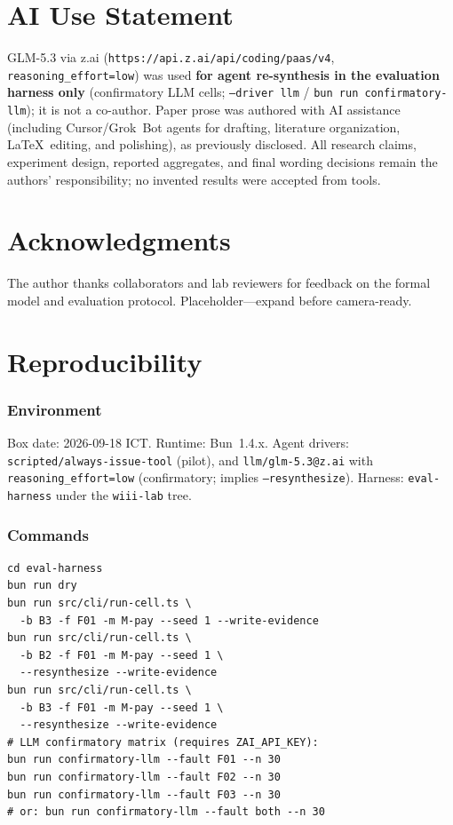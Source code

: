 \documentclass[11pt,a4paper]{article}
\begin{document}
\section*{AI Use Statement}
\label{sec:ai-use}

GLM-5.3 via z.ai (\texttt{https://api.z.ai/api/coding/paas/v4},
\texttt{reasoning\_effort=low}) was used \textbf{for agent re-synthesis in
the evaluation harness only} (confirmatory LLM cells;
\texttt{--driver llm} / \texttt{bun run confirmatory-llm}); it is not a
co-author. Paper prose was authored with AI assistance (including
Cursor/Grok~Bot agents for drafting, literature organization, \LaTeX\
editing, and polishing), as previously disclosed. All research claims,
experiment design, reported aggregates, and final wording decisions remain
the authors' responsibility; no invented results were accepted from tools.

\section*{Acknowledgments}
The author thanks collaborators and lab reviewers for feedback on the
formal model and evaluation protocol. Placeholder---expand before
camera-ready.




\appendix

\section{Reproducibility}
\label{app:repro}

\subsubsection*{Environment}
Box date: 2026-09-18 ICT. Runtime: Bun~1.4.x.
Agent drivers: \texttt{scripted/always-issue-tool} (pilot), and
\texttt{llm/glm-5.3@z.ai} with \texttt{reasoning\_effort=low}
(confirmatory; implies \texttt{--resynthesize}).
Harness: \texttt{eval-harness} under the \texttt{wiii-lab} tree.

\subsubsection*{Commands}
{\small\begin{verbatim}
cd eval-harness
bun run dry
bun run src/cli/run-cell.ts \
  -b B3 -f F01 -m M-pay --seed 1 --write-evidence
bun run src/cli/run-cell.ts \
  -b B2 -f F01 -m M-pay --seed 1 \
  --resynthesize --write-evidence
bun run src/cli/run-cell.ts \
  -b B3 -f F01 -m M-pay --seed 1 \
  --resynthesize --write-evidence
# LLM confirmatory matrix (requires ZAI_API_KEY):
bun run confirmatory-llm --fault F01 --n 30
bun run confirmatory-llm --fault F02 --n 30
bun run confirmatory-llm --fault F03 --n 30
# or: bun run confirmatory-llm --fault both --n 30
\end{verbatim}}
\end{document}
